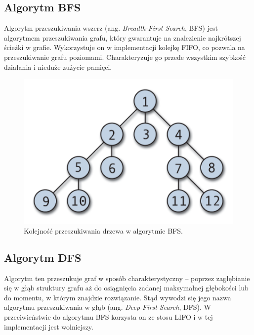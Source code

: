 \documentclass{classrep}
\begin{document}
    \subsection{Algorytm BFS}\label{subsec:algorytm-bfs}
    Algorytm przeszukiwania wszerz (ang. \textit{Breadth-First Search}, BFS) jest algorytmem przeszukiwania grafu,
    który gwarantuje na znalezienie najkrótszej ścieżki w grafie.
    Wykorzystuje on w implementacji kolejkę FIFO, co pozwala na przeszukiwanie grafu poziomami.
    Charakteryzuje go przede wszystkim szybkość działania i nieduże zużycie pamięci. \cite{kielce}

    \begin{figure}[h]
        \centering
        \includegraphics[width=0.5\linewidth]{src/bfs}
        \caption{Kolejność przeszukiwania drzewa w algorytmie BFS. \cite{wikibfs}}
        \label{fig:bfs}
    \end{figure}

    \subsection{Algorytm DFS}\label{subsec:algorytm-dfs}
    Algorytm ten przeszukuje graf w sposób charakterystyczny -- poprzez zagłębianie się w głąb struktury grafu aż do
    osiągnięcia zadanej maksymalnej głębokości lub do momentu, w którym znajdzie rozwiązanie.
    Stąd wywodzi się jego nazwa algorytmu przeszukiwania w głąb (ang. \textit{Deep-First Search}, DFS).
    W przeciwieństwie do algorytmu BFS korzysta on ze stosu LIFO i w tej implementacji jest wolniejszy. \cite{kielce}
\end{document}
